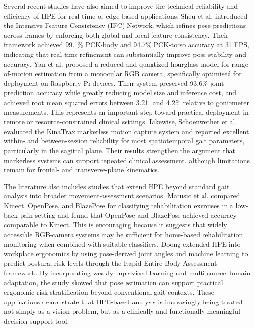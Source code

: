 \documentclass[12pt]{elsarticle}
\begin{document}
Several recent studies have also aimed to improve the technical reliability and efficiency of HPE for real-time or edge-based applications. Sheu et al. \cite{sheu2023improvement} introduced the Intensive Feature Consistency (IFC) Network, which refines pose predictions across frames by enforcing both global and local feature consistency. Their framework achieved 99.1\% PCK-body and 94.7\% PCK-torso accuracy at 31 FPS, indicating that real-time refinement can substantially improve pose stability and accuracy. Yan et al. \cite{yan2025efficient} proposed a reduced and quantized hourglass model for range-of-motion estimation from a monocular RGB camera, specifically optimised for deployment on Raspberry Pi devices. Their system preserved 93.6\% joint-prediction accuracy while greatly reducing model size and inference cost, and achieved root mean squared errors between 3.21$^\circ$ and 4.25$^\circ$ relative to goniometer measurements. This represents an important step toward practical deployment in remote or resource-constrained clinical settings. Likewise, Schoenwether et al. \cite{schoenwether2025reliability} evaluated the KinaTrax markerless motion capture system and reported excellent within- and between-session reliability for most spatiotemporal gait parameters, particularly in the sagittal plane. Their results strengthen the argument that markerless systems can support repeated clinical assessment, although limitations remain for frontal- and transverse-plane kinematics.

The literature also includes studies that extend HPE beyond standard gait analysis into broader movement-assessment scenarios. Marusic et al. \cite{marusic2023evaluating} compared Kinect, OpenPose, and BlazePose for classifying rehabilitation exercises in a low-back-pain setting and found that OpenPose and BlazePose achieved accuracy comparable to Kinect. This is encouraging because it suggests that widely accessible RGB-camera systems may be sufficient for home-based rehabilitation monitoring when combined with suitable classifiers. Doong \cite{doong2025predicting} extended HPE into workplace ergonomics by using pose-derived joint angles and machine learning to predict postural risk levels through the Rapid Entire Body Assessment framework. By incorporating weakly supervised learning and multi-source domain adaptation, the study showed that pose estimation can support practical ergonomic risk stratification beyond conventional gait contexts. These applications demonstrate that HPE-based analysis is increasingly being treated not simply as a vision problem, but as a clinically and functionally meaningful decision-support tool.
\end{document}
